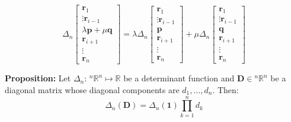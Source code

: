 \documentclass{article}
\newcommand{\bff}[1]{\mathbf{#1}}
\begin{document}
\begin{minipage}[t]{0.45\linewidth}
\begin{enumerate}
            \begin{equation*}
                \Delta_n \begin{bmatrix}
                    \bff{r}_1 \\ \vdots \bff{r}_{i-1} \\ \lambda \bff{p}+\mu\bff{q} \\ \bff{r}_{i+1} \\ \vdots \\ \bff{r}_n
                \end{bmatrix} = 
                \lambda \Delta_n\begin{bmatrix}
                    \bff{r}_1 \\ \vdots \bff{r}_{i-1} \\ \bff{p} \\ \bff{r}_{i+1} \\ \vdots \\ \bff{r}_n
                \end{bmatrix} + \mu \Delta_n\begin{bmatrix}
                    \bff{r}_1 \\ \vdots \bff{r}_{i-1} \\ \bff{q} \\ \bff{r}_{i+1} \\ \vdots \\ \bff{r}_n
                \end{bmatrix}
            \end{equation*}
        \end{enumerate}
        \textbf{Proposition:} Let $\Delta_n:\, {^n}\mathbb{R}^n \mapsto \mathbb{R}$ be a determinant function and $\bff{D} \in {^n}\mathbb{R}^n$ be a diagonal matrix whose diagonal components are $d_1,\dots, d_n.$ Then:
        \begin{equation*}
            \Delta_n(\bff{D}) = \Delta_n(\bff{1})\prod_{k=1}^n d_k
        \end{equation*}
    \end{minipage}
    \hfill
\end{document}
